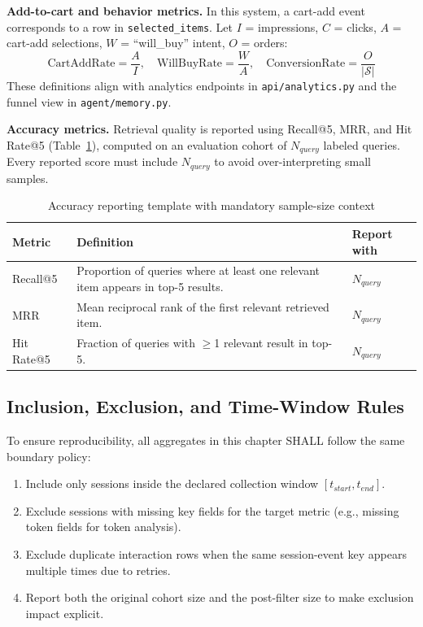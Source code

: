\documentclass[12pt, twoside]{report}
\begin{document}
\textbf{Add-to-cart and behavior metrics.}
In this system, a cart-add event corresponds to a row in \texttt{selected\_items}. Let $I$ = impressions, $C$ = clicks, $A$ = cart-add selections, $W$ = ``will\_buy'' intent, $O$ = orders:
\begin{equation}
\text{CartAddRate}=\frac{A}{I},\quad
\text{WillBuyRate}=\frac{W}{A},\quad
\text{ConversionRate}=\frac{O}{|\mathcal{S}|}
\end{equation}
These definitions align with analytics endpoints in \texttt{api/analytics.py} and the funnel view in \texttt{agent/memory.py}.

\textbf{Accuracy metrics.}
Retrieval quality is reported using Recall@5, MRR, and Hit Rate@5 (Table~\ref{tab:accuracy_reporting_template}), computed on an evaluation cohort of $N_{query}$ labeled queries. Every reported score must include $N_{query}$ to avoid over-interpreting small samples.

\begin{table}[H]
\centering
\begin{tabular}{p{2.8cm}p{8.4cm}p{2.4cm}}
\toprule
\textbf{Metric} & \textbf{Definition} & \textbf{Report with}\\
\midrule
Recall@5 & Proportion of queries where at least one relevant item appears in top-5 results. & $N_{query}$\\
MRR & Mean reciprocal rank of the first relevant retrieved item. & $N_{query}$\\
Hit Rate@5 & Fraction of queries with $\geq$1 relevant result in top-5. & $N_{query}$\\
\bottomrule
\end{tabular}
\caption{Accuracy reporting template with mandatory sample-size context}
\label{tab:accuracy_reporting_template}
\end{table}

\subsection{Inclusion, Exclusion, and Time-Window Rules}
\label{subsec:inclusion_exclusion_rules}

To ensure reproducibility, all aggregates in this chapter SHALL follow the same boundary policy:
\begin{enumerate}
    \item Include only sessions inside the declared collection window $[t_{start}, t_{end}]$.
    \item Exclude sessions with missing key fields for the target metric (e.g., missing token fields for token analysis).
    \item Exclude duplicate interaction rows when the same session-event key appears multiple times due to retries.
    \item Report both the original cohort size and the post-filter size to make exclusion impact explicit.
\end{enumerate}
\end{document}
